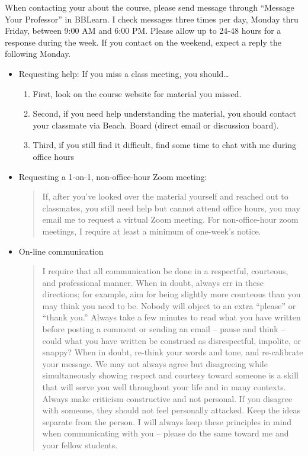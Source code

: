 \documentclass[11pt,]{article}
\providecommand{\tightlist}{%
  \setlength{\itemsep}{0pt}\setlength{\parskip}{0pt}}
\begin{document}
When contacting your about the course, please send message through
``Message Your Professor'' in BBLearn. I check messages three times per
day, Monday thru Friday, between 9:00 AM and 6:00 PM. Please allow up to
24-48 hours for a response during the week. If you contact on the
weekend, expect a reply the following Monday.

\begin{itemize}
\item
  Requesting help: If you miss a class meeting, you should\ldots{}

  \begin{enumerate}
  \def\labelenumi{\arabic{enumi}.}
  \tightlist
  \item
    First, look on the course website for material you missed.
  \item
    Second, if you need help understanding the material, you should
    contact your classmate via Beach. Board (direct email or discussion
    board).
  \item
    Third, if you still find it difficult, find some time to chat with
    me during office hours
  \end{enumerate}
\item
  Requesting a 1-on-1, non-office-hour Zoom meeting:

  \begin{quote}
  If, after you've looked over the material yourself and reached out to
  classmates, you still need help but cannot attend office hours, you
  may email me to request a virtual Zoom meeting. For non-office-hour
  zoom meetings, I require at least a minimum of one-week's notice.
  \end{quote}
\item
  On-line communication

  \begin{quote}
  I require that all communication be done in a respectful, courteous,
  and professional manner. When in doubt, always err in these
  directions; for example, aim for being slightly more courteous than
  you may think you need to be. Nobody will object to an extra
  ``please'' or ``thank you.'' Always take a few minutes to read what
  you have written before posting a comment or sending an email -- pause
  and think -- could what you have written be construed as
  disrespectful, impolite, or snappy? When in doubt, re-think your words
  and tone, and re-calibrate your message. We may not always agree but
  disagreeing while simultaneously showing respect and courtesy toward
  someone is a skill that will serve you well throughout your life and
  in many contexts. Always make criticism constructive and not personal.
  If you disagree with someone, they should not feel personally
  attacked. Keep the ideas separate from the person. I will always keep
  these principles in mind when communicating with you -- please do the
  same toward me and your fellow students.
  \end{quote}
\end{itemize}
\end{document}
